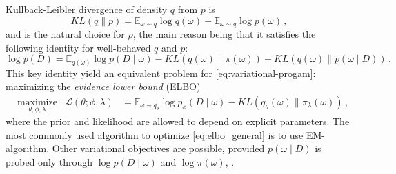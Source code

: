 \documentclass[a4paper,10pt]{article}
\begin{document}
Kullback-Leibler divergence of density $q$ from $p$ is
\begin{equation} \label{eq:kl-div-def}
  KL(q \| p)
    = \mathbb{E}_{\omega \sim q}
      \log{q(\omega)}
    - \mathbb{E}_{\omega \sim q}
      \log{p(\omega)}
    \,,
\end{equation}
and is the natural choice for $\rho$, the main reason being that it satisfies the following
identity for well-behaved $q$ and $p$:
\begin{equation} \label{eq:kl-div-master}
  \log p(D)
    = \mathbb{E}_{q(\omega)} \log{p(D \mid \omega)}
    - KL(q(\omega) \| \pi(\omega))
    + KL(q(\omega) \| p(\omega \mid D))
    \,.
\end{equation}
This key identity yield an equivalent problem for \eqref{eq:variational-progam}:
maximizing the \textit{evidence lower bound} (ELBO)
\begin{equation} \label{eq:elbo_general}
\begin{aligned}
  & \underset{\theta, \phi, \lambda}{\text{maximize}}
    & \mathcal{L}(\theta; \phi, \lambda)
      & = \mathbb{E}_{\omega \sim q_{\theta}}
          \log p_{\phi}(D \mid \omega)
        - KL(q_{\theta}(\omega) \| \pi_{\lambda}(\omega))
  \,,
\end{aligned}
\end{equation}
where the prior and likelihood are allowed to depend on explicit parameters. The most
commonly used algorithm to optimize \eqref{eq:elbo_general} is to use EM-algorithm.
Other variational objectives are possible, provided $p(\omega \mid D)$ is probed only
through $\log p(D \mid \omega)$ and $\log \pi(\omega)$, \cite{ranganath_operator_2018}.
\end{document}
